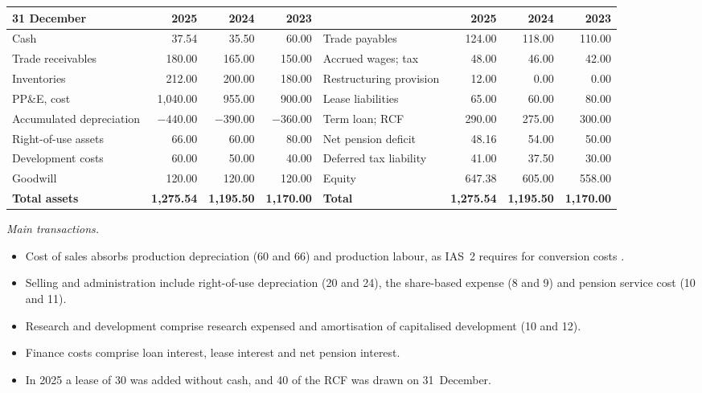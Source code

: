 \begin{qfexample}
\begin{center}\small
\begin{tabular}{@{}lrrr@{\qquad}lrrr@{}}
\toprule
31 December & 2025 & 2024 & 2023 & & 2025 & 2024 & 2023\\
\midrule
Cash & 37.54 & 35.50 & 60.00 & Trade payables & 124.00 & 118.00 & 110.00\\
Trade receivables & 180.00 & 165.00 & 150.00 & Accrued wages; tax & 48.00 & 46.00 & 42.00\\
Inventories & 212.00 & 200.00 & 180.00 & Restructuring provision & 12.00 & 0.00 & 0.00\\
PP\&E, cost & 1{,}040.00 & 955.00 & 900.00 & Lease liabilities & 65.00 & 60.00 & 80.00\\
Accumulated depreciation & $-440.00$ & $-390.00$ & $-360.00$ & Term loan; RCF & 290.00 & 275.00 & 300.00\\
Right-of-use assets & 66.00 & 60.00 & 80.00 & Net pension deficit & 48.16 & 54.00 & 50.00\\
Development costs & 60.00 & 50.00 & 40.00 & Deferred tax liability & 41.00 & 37.50 & 30.00\\
Goodwill & 120.00 & 120.00 & 120.00 & Equity & 647.38 & 605.00 & 558.00\\
\textbf{Total assets} & \textbf{1{,}275.54} & \textbf{1{,}195.50} & \textbf{1{,}170.00} & \textbf{Total} & \textbf{1{,}275.54} & \textbf{1{,}195.50} & \textbf{1{,}170.00}\\
\bottomrule
\end{tabular}
\end{center}

\emph{Main transactions.}
\begin{itemize}
\item Cost of sales absorbs production depreciation (60 and 66) and production labour, as IAS~2 requires for conversion costs \citep[IAS~2 para.~12]{eu-2023-1803-ias2}.
\item Selling and administration include right-of-use depreciation (20 and 24), the share-based expense (8 and 9) and pension service cost (10 and 11).
\item Research and development comprise research expensed and amortisation of capitalised development (10 and 12).
\item Finance costs comprise loan interest, lease interest and net pension interest.
\item In 2025 a lease of 30 was added without cash, and 40 of the RCF was drawn on 31~December.
\end{itemize}


\end{qfexample}
